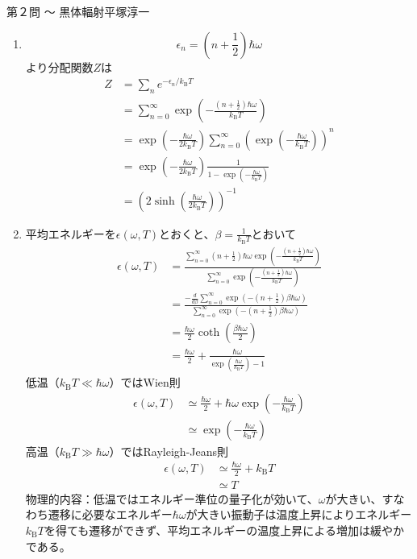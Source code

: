 \begin{answer}{第２問 〜 黒体輻射}{平塚淳一}
\begin{enumerate}
\def\kB{k_\mathrm{B}}
\item 
  \begin{equation}
  \epsilon_n=(n+\frac{1}{2})\hbar \omega
  \end{equation}
  より分配関数$Z$は
  \begin{align}
  Z&=\sum_n e^{-\epsilon_n /\kB T}\\
  &=\sum_{n=0}^{\infty}\exp{(-\frac{(n+\frac{1}{2})\hbar \omega}{\kB T})}\\
  &=\exp{(-\frac{\hbar \omega}{2\kB T})}\sum_{n=0}^{\infty}(\exp{(-\frac{\hbar \omega}{\kB T})})^n\\
  &=\exp{(-\frac{\hbar \omega}{2\kB T})}\frac{1}{1-\exp{(-\frac{\hbar \omega}{\kB T})}}\\
  &=(2\sinh (\frac{\hbar \omega}{2\kB T}))^{-1}
  \end{align}
\item 平均エネルギーを$\epsilon(\omega,T)$とおくと、$\beta=\frac{1}{\kB T}$とおいて
  \begin{align}
  \epsilon(\omega,T)
  &=\frac{\sum_{n=0}^{\infty}(n+\frac{1}{2})\hbar \omega\exp{(-\frac{(n+\frac{1}{2})\hbar \omega}{\kB T})}}{\sum_{n=0}^{\infty}\exp{(-\frac{(n+\frac{1}{2})\hbar \omega}{\kB T})}}\\
  &=\frac{-\frac{d}{d\beta}\sum_{n=0}^{\infty}\exp{(-(n+\frac{1}{2})\beta\hbar \omega)}}{\sum_{n=0}^{\infty}\exp{(-(n+\frac{1}{2})\beta\hbar \omega)}}\\
  &=\frac{\hbar \omega}{2}\coth (\frac{\beta\hbar \omega}{2})\\
  &=\frac{\hbar \omega}{2}+\frac{\hbar \omega}{\exp{(\frac{\hbar \omega}{\kB T})}-1}
  \end{align}
  低温（$\kB T\ll\hbar \omega$）ではWien則
  \begin{align}
  \epsilon(\omega,T)
  &\simeq \frac{\hbar \omega}{2}+\hbar \omega\exp{(-\frac{\hbar \omega}{\kB T})}\\
  &\simeq \exp{(-\frac{\hbar \omega}{\kB T})}
  \end{align}
  高温（$\kB T\gg\hbar \omega$）ではRayleigh-Jeans則
  \begin{align}
  \epsilon(\omega,T)
  &\simeq \frac{\hbar \omega}{2}+\kB T\\
  &\simeq T
  \end{align}
  物理的内容：低温ではエネルギー準位の量子化が効いて、$\omega$が大きい、すなわち遷移に必要なエネルギー$\hbar \omega$が大きい振動子は温度上昇によりエネルギー$\kB T$を得ても遷移ができず、平均エネルギーの温度上昇による増加は緩やかである。\\

\end{enumerate}
\end{answer}
